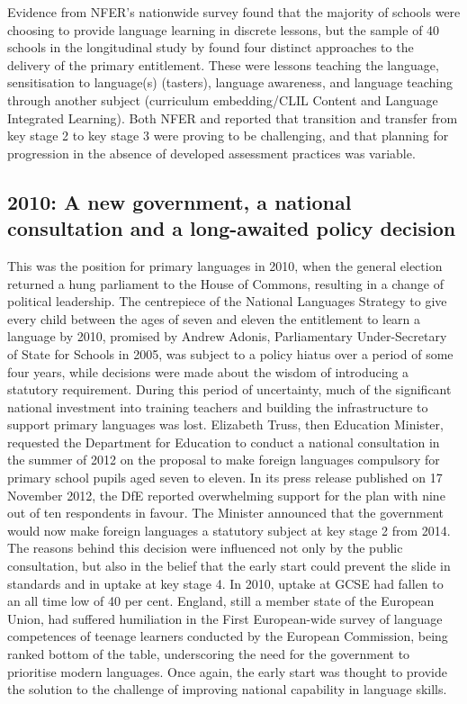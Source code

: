 \documentclass[output=paper]{langscibook}
\begin{document}
Evidence from NFER’s nationwide survey found that the majority of schools were choosing to provide language learning in discrete lessons, but the sample of 40 schools in the longitudinal study by \citeauthor{CableEtAl2010} found four distinct approaches to the delivery of the primary entitlement. These were lessons teaching the language, sensitisation to language(s) (tasters), language awareness, and language teaching through another subject (curriculum embedding/CLIL Content and Language Integrated Learning). Both NFER and \citeauthor{CableEtAl2010} reported that transition and transfer from key stage 2 to key stage 3 were proving to be challenging, and that planning for progression in the absence of developed assessment practices was variable.

\subsection{2010: A new government, a national consultation and a long-awaited policy decision}

This was the position for primary languages in 2010, when the general election returned a hung parliament to the House of Commons, resulting in a change of political leadership. The centrepiece of the National Languages Strategy to give every child between the ages of seven and eleven the entitlement to learn a language by 2010, promised by Andrew Adonis, Parliamentary Under-Secretary of State for Schools in 2005, was subject to a policy hiatus over a period of some four years, while decisions were made about the wisdom of introducing a statutory requirement. During this period of uncertainty, much of the significant national investment into training teachers and building the infrastructure to support primary languages was lost. Elizabeth Truss, then Education Minister, requested the Department for Education to conduct a national consultation in the summer of 2012 on the proposal to make foreign languages compulsory for primary school pupils aged seven to eleven. In its press release published on 17  November 2012, the DfE reported overwhelming support for the plan with nine out of ten respondents in favour. The Minister announced that the government would now make foreign languages a statutory subject at key stage 2 from 2014. The reasons behind this decision were influenced not only by the public consultation, but also in the belief that the early start could prevent the slide in standards and in uptake at key stage 4. In 2010, uptake at GCSE had fallen to an all time low of 40 per cent. England, still a member state of the European Union, had suffered humiliation in the First European-wide survey of language competences of teenage learners conducted by the European Commission, being ranked bottom of the table, underscoring the need for the government to prioritise modern languages. Once again, the early start was thought to provide the solution to the challenge of improving national capability in language skills. 
\end{document}

